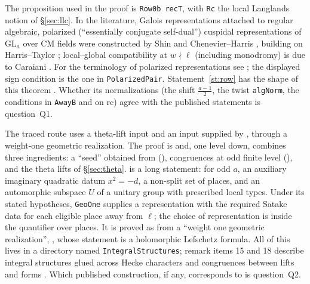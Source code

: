 \noindent The proposition used in the proof is \texttt{Row0b recT}, with \texttt{Rc} the local
Langlands notion of \S\ref{sec:llc}. In the literature, Galois representations attached to
regular algebraic, polarized (``essentially conjugate self-dual'') cuspidal representations of
$\mathrm{GL}_a$ over CM fields were constructed by Shin \cite{shin} and Chenevier--Harris
\cite{chenevier-harris}, building on Harris--Taylor \cite{harris-taylor}; local--global compatibility
at $w\nmid\ell$ (including monodromy) is due to Caraiani \cite{caraiani-duke}. For the terminology
of polarized representations see \cite{blggt}; the displayed sign condition is the one in
\texttt{PolarizedPair}. Statement~\ref{st:row} has the shape of this theorem \sti. Whether its
normalizations (the shift $\frac{a-1}2$, the twist \texttt{algNorm}, the conditions in
\texttt{AwayB} and on $\mathrm{rc}$) agree with the published statements is question~Q1.

The traced route uses a theta-lift input and an input supplied by
, through a weight-one geometric realization. The proof
is
\noindent and, one level down,
combines three ingredients: a ``seed'' obtained from 
(), congruences at odd finite level
(), and the theta lifts of \S\ref{sec:theta}.
is a long statement: for odd $a$, an auxiliary imaginary quadratic datum $x^2=-d$, a non-split set of
places, and an automorphic subspace $U$ of a unitary group with prescribed local types. Under its
stated hypotheses, \texttt{GeoOne} supplies a representation with the required Satake data for each
eligible place away from $\ell$; the choice of representation is inside the quantifier over places.
It is proved as 
from a ``weight one geometric realization'',
, whose statement is a holomorphic
Lefschetz formula. All of this lives in a directory named
\texttt{IntegralStructures}; remark items 15 and 18 describe integral structures glued across Hecke
characters and congruences between lifts and forms . Which published construction, if
any,  corresponds to is question~Q2.

